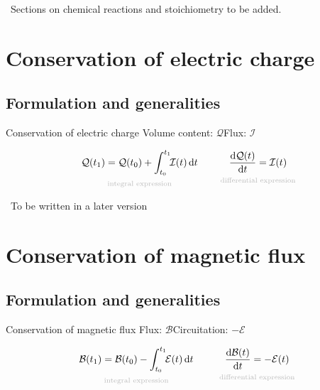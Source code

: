 \documentclass[a4paper,12pt,%
onecolumn,oneside,%
british%
]{memoir}
\newcommand{\mynotew}[1]{{\footnotesize\color{midgrey}\faIcon{tools}\ #1}}
\newcommand*{\di}{\mathrm{d}}%
\renewcommand*{\|}[1][]{\nonscript\:#1\vert\nonscript\:\mathopen{}}
\newcommand*{\yti}{t_{0}}
\newcommand*{\ytf}{t_{1}}
\newcommand*{\dt}{\di t}
\newcommand*{\yC}{\mathcal{Q}}
\newcommand*{\yI}{\mathcal{I}}
\newcommand*{\yBf}{\mathcal{B}}
\newcommand*{\yEv}{\mathcal{E}}
\begin{document}
\bigskip
\mynotew{Sections on chemical reactions and stoichiometry to be added.}

\printpagenotes*
\cleartooddpage
\chapter{Conservation of electric charge}
\label{cha:cons_charge}

\section{Formulation and generalities}
\label{sec:cons_charge_formulation}

\begin{definition}{Conservation of electric charge}
  Volume content: $\yC$\qquad Flux: $\yI$

  \begin{equation}
    \label{eq:cons_charge}
    \underbracket[0pt]{\yC(\ytf) =
      \yC(\yti) +
      \int_{\yti}^{\ytf}\!\!\yI(t)\,\dt}_{\mathclap{\text{\color{grey}integral expression}}}
      \qquad\quad
      \underbracket[0pt]{\frac{\di\yC(t)}{\dt} =
        \yI(t)}_{\mathclap{\text{\color{grey}differential expression}}}
  \end{equation}
\end{definition}


\mynotew{To be written in a later version}


\printpagenotes*
\cleartooddpage
\chapter{Conservation of magnetic flux}
\label{cha:cons_magneticflux}

\section{Formulation and generalities}
\label{sec:cons_magneticflux_formulation}

\begin{definition}{Conservation of magnetic flux}
  Flux: $\yBf$\qquad Circuitation: $-\yEv$

  \begin{equation}
    \label{eq:cons_magneticflux}
    \underbracket[0pt]{\yBf(\ytf) =
      \yBf(\yti) -
      \int_{\yti}^{\ytf}\!\!\yEv(t)\,\dt}_{\mathclap{\text{\color{grey}integral expression}}}
      \qquad\quad
      \underbracket[0pt]{\frac{\di\yBf(t)}{\dt} =
        -\yEv(t)}_{\mathclap{\text{\color{grey}differential expression}}}
  \end{equation}
\end{definition}
\end{document}
